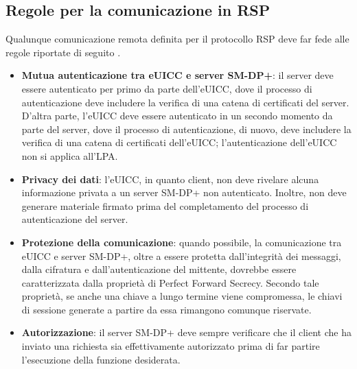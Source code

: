 \documentclass[10pt, oneside]{book}
\begin{document}
\subsection{Regole per la comunicazione in RSP}
Qualunque comunicazione remota definita per il protocollo RSP deve far fede alle regole riportate di seguito \cite{GSMA-docs-new}.
\begin{itemize}
\item \textbf{Mutua autenticazione tra eUICC e server SM-DP+}: il server deve essere autenticato per primo da parte dell'eUICC, dove il processo di autenticazione deve includere la verifica di una catena di certificati del server. D'altra parte, l'eUICC deve essere autenticato in un secondo momento da parte del server, dove il processo di autenticazione, di nuovo, deve includere la verifica di una catena di certificati dell'eUICC; l'autenticazione dell'eUICC non si applica all'LPA.
\item \textbf{Privacy dei dati}: l'eUICC, in quanto client, non deve rivelare alcuna informazione privata a un server SM-DP+ non autenticato. Inoltre, non deve generare materiale firmato prima del completamento del processo di autenticazione del server.
\item \textbf{Protezione della comunicazione}: quando possibile, la comunicazione tra eUICC e server SM-DP+, oltre a essere protetta dall'integrità dei messaggi, dalla cifratura e dall'autenticazione del mittente, dovrebbe essere caratterizzata dalla proprietà di Perfect Forward Secrecy. Secondo tale proprietà, se anche una chiave a lungo termine viene compromessa, le chiavi di sessione generate a partire da essa rimangono comunque riservate.
\item \textbf{Autorizzazione}: il server SM-DP+ deve sempre verificare che il client che ha inviato una richiesta sia effettivamente autorizzato prima di far partire l'esecuzione della funzione desiderata.
\end{itemize}
\end{document}
